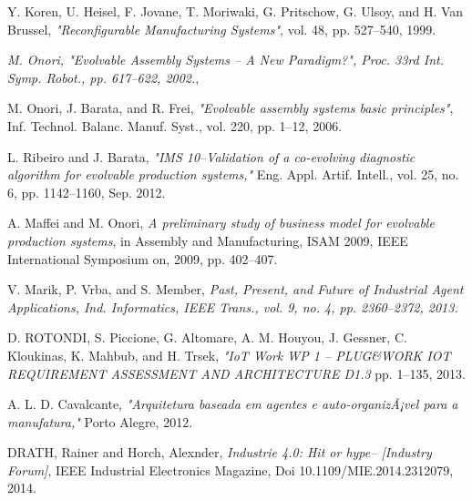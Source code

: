 \documentclass[10pt,letterpaper,twocolumn]{IEEEtran}
\begin{document}
\begin{thebibliography}{99}
	Y. Koren, U. Heisel, F. Jovane, T. Moriwaki, G. Pritschow, G. Ulsoy, and H. Van Brussel, 
	\emph{"Reconfigurable Manufacturing Systems"}, vol. 48, pp. 527--540, 1999.
	
	\emph{	M. Onori, "Evolvable Assembly Systems -- A New Paradigm?", Proc. 33rd Int. Symp. Robot., pp. 617--622, 2002.},
	
	 M. Onori, J. Barata, and R. Frei, 
	\emph {"Evolvable assembly systems basic principles"}, Inf. Technol. Balanc. Manuf. Syst., vol. 220, pp. 1--12, 2006.
	
	L. Ribeiro and J. Barata,			
	\emph {"IMS 10--Validation of a co-evolving diagnostic algorithm for evolvable production systems,"} Eng. Appl. Artif. Intell., vol. 25, no. 6, pp. 1142--1160, Sep. 2012.
		
	A. Maffei and M. Onori,
	\emph{{A preliminary study of business model for evolvable production systems}}, in Assembly and Manufacturing, ISAM 2009, IEEE International Symposium on, 2009, pp. 402--407.
	

		V. Marik, P. Vrba, and S. Member,
		\emph{ Past, Present, and Future of Industrial Agent Applications, Ind. Informatics, IEEE Trans., vol. 9, no. 4, pp. 2360--2372, 2013.}
				
	 D. ROTONDI, S. Piccione, G. Altomare, A. M. Houyou, J. Gessner, C. Kloukinas, K. Mahbub, and H. Trsek,
	\emph{"IoT \@ Work WP 1 -- PLUG\&WORK IOT REQUIREMENT ASSESSMENT AND ARCHITECTURE D1.3}   pp. 1--135, 2013.		
				
	 A. L. D. Cavalcante,
	\emph{"Arquitetura baseada em agentes e auto-organizÃ¡vel para a manufatura,"} Porto Alegre, 2012.

	 DRATH, Rainer and Horch, Alexnder,
	\emph{{Industrie 4.0: Hit or hype-- [Industry Forum]}}, IEEE Industrial Electronics Magazine, 	Doi {10.1109/MIE.2014.2312079}, 2014.	
	

\end{thebibliography}
\end{document}

